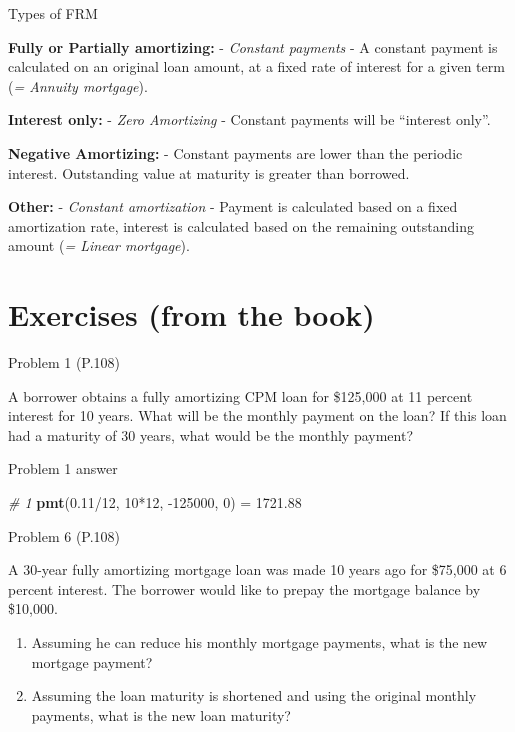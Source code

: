 \documentclass[ignorenonframetext,]{beamer}
\newenvironment{Shaded}{\begin{snugshade}}{\end{snugshade}}
\newcommand{\KeywordTok}[1]{\textcolor[rgb]{0.13,0.29,0.53}{\textbf{{#1}}}}
\newcommand{\DecValTok}[1]{\textcolor[rgb]{0.00,0.00,0.81}{{#1}}}
\newcommand{\FloatTok}[1]{\textcolor[rgb]{0.00,0.00,0.81}{{#1}}}
\newcommand{\StringTok}[1]{\textcolor[rgb]{0.31,0.60,0.02}{{#1}}}
\newcommand{\CommentTok}[1]{\textcolor[rgb]{0.56,0.35,0.01}{\textit{{#1}}}}
\newcommand{\NormalTok}[1]{{#1}}
\providecommand{\tightlist}{%
\setlength{\itemsep}{0pt}\setlength{\parskip}{0pt}}
\begin{document}
\begin{frame}{Types of FRM}

\textbf{Fully or Partially amortizing:} - \emph{Constant payments} - A
constant payment is calculated on an original loan amount, at a fixed
rate of interest for a given term (\emph{= Annuity mortgage}).

\textbf{Interest only:} - \emph{Zero Amortizing} - Constant payments
will be ``interest only''.

\textbf{Negative Amortizing:} - Constant payments are lower than the
periodic interest. Outstanding value at maturity is greater than
borrowed.

\textbf{Other:} - \emph{Constant amortization} - Payment is calculated
based on a fixed amortization rate, interest is calculated based on the
remaining outstanding amount (\emph{= Linear mortgage}).

\end{frame}

\section{Exercises (from the book)}\label{exercises-from-the-book}

\begin{frame}{Problem 1 (P.108)}

A borrower obtains a fully amortizing CPM loan for \$125,000 at 11
percent interest for 10 years. What will be the monthly payment on the
loan? If this loan had a maturity of 30 years, what would be the monthly
payment?

\end{frame}

\begin{frame}[fragile]{Problem 1 answer}

\begin{Shaded}
\begin{Highlighting}[]
\CommentTok{# 1}
\KeywordTok{pmt}\NormalTok{(}\FloatTok{0.11}\NormalTok{/}\DecValTok{12}\NormalTok{, }\DecValTok{10}\NormalTok{*}\DecValTok{12}\NormalTok{, -}\DecValTok{125000}\NormalTok{, }\DecValTok{0}\NormalTok{) =}\StringTok{ }
\FloatTok{1721.88}
\end{Highlighting}
\end{Shaded}

\end{frame}

\begin{frame}{Problem 6 (P.108)}

A 30-year fully amortizing mortgage loan was made 10 years ago for
\$75,000 at 6 percent interest. The borrower would like to prepay the
mortgage balance by \$10,000.

\begin{enumerate}
\def\labelenumi{\alph{enumi}.}
\tightlist
\item
  Assuming he can reduce his monthly mortgage payments, what is the new
  mortgage payment?
\item
  Assuming the loan maturity is shortened and using the original monthly
  payments, what is the new loan maturity?
\end{enumerate}

\end{frame}
\end{document}
